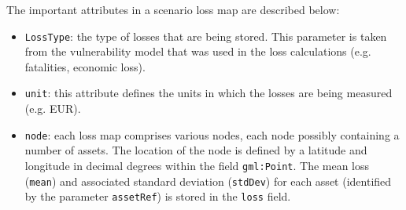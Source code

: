 The important attributes in a scenario loss map are described below:

\begin{itemize}

  \item \Verb+LossType+: the type of losses that are being stored. This
    parameter is taken from the \gls{vulnerability model} that was used in the
    loss calculations (e.g. fatalities, economic loss).

  \item \Verb+unit+: this attribute defines the units in which the losses are
    being measured (e.g. EUR).

  \item \Verb+node+: each loss map comprises various nodes, each node possibly
    containing a number of \glspl{asset}. The location of the node is defined
    by a latitude and longitude in decimal degrees within the field
    \Verb+gml:Point+. The mean loss (\Verb+mean+) and associated standard
    deviation (\Verb+stdDev+) for each \gls{asset} (identified by the parameter
    \Verb+assetRef+) is stored in the \Verb+loss+ field.

\end{itemize}